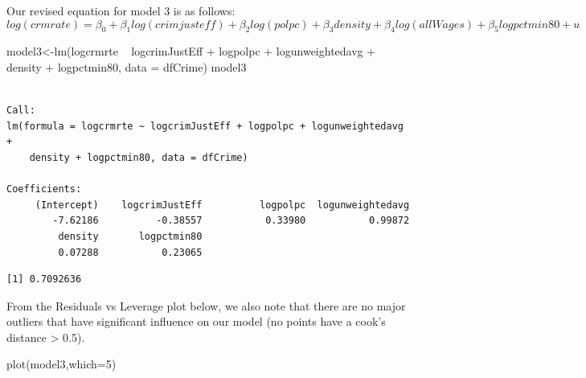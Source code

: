 \documentclass[]{article}
\newenvironment{Shaded}{}{}
\newcommand{\DataTypeTok}[1]{#1}
\newcommand{\DecValTok}[1]{#1}
\newcommand{\KeywordTok}[1]{\textcolor[rgb]{0.00,0.00,1.00}{#1}}
\newcommand{\NormalTok}[1]{#1}
\newcommand{\OperatorTok}[1]{#1}
\newcommand{\StringTok}[1]{\textcolor[rgb]{0.00,0.50,0.50}{#1}}
\begin{document}
Our revised equation for model 3 is as follows:
\[log(crmrate) = \beta_0 + \beta_1log(crimjusteff) + \beta_2log(polpc) + \beta_3density + \beta_4log(allWages) + \beta_5logpctmin80 +u\]

\begin{Shaded}
\begin{Highlighting}[]
\NormalTok{model3<-}\KeywordTok{lm}\NormalTok{(logcrmrte }\OperatorTok{~}\StringTok{ }\NormalTok{logcrimJustEff }\OperatorTok{+}\StringTok{ }\NormalTok{logpolpc }\OperatorTok{+}\StringTok{ }\NormalTok{logunweightedavg }\OperatorTok{+}\StringTok{  }\NormalTok{density }\OperatorTok{+}\StringTok{ }\NormalTok{logpctmin80, }\DataTypeTok{data =}\NormalTok{ dfCrime)}
\NormalTok{model3}
\end{Highlighting}
\end{Shaded}

\begin{verbatim}

Call:
lm(formula = logcrmrte ~ logcrimJustEff + logpolpc + logunweightedavg + 
    density + logpctmin80, data = dfCrime)

Coefficients:
     (Intercept)    logcrimJustEff          logpolpc  logunweightedavg  
        -7.62186          -0.38557           0.33980           0.99872  
         density       logpctmin80  
         0.07288           0.23065  
\end{verbatim}

\begin{Shaded}
\end{Shaded}

\begin{verbatim}
[1] 0.7092636
\end{verbatim}

From the Residuals vs Leverage plot below, we also note that there are
no major outliers that have significant influence on our model (no
points have a cook's distance \textgreater{} 0.5).

\begin{Shaded}
\begin{Highlighting}[]
\KeywordTok{plot}\NormalTok{(model3,}\DataTypeTok{which=}\DecValTok{5}\NormalTok{)}
\end{Highlighting}
\end{Shaded}
\end{document}
